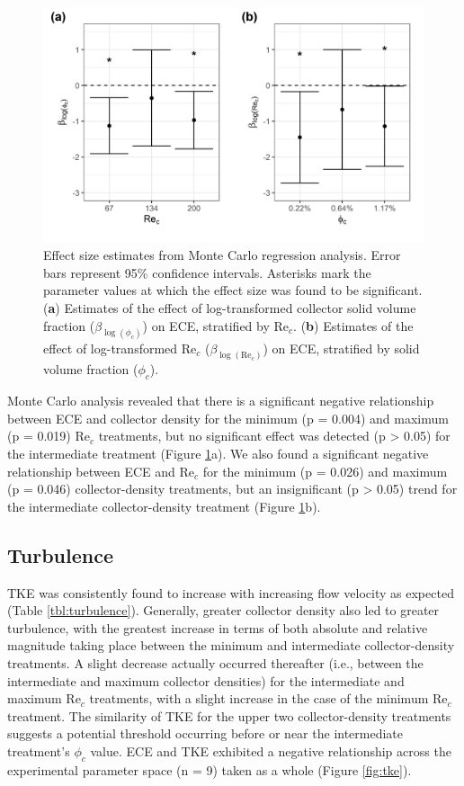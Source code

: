 \documentclass[geosciences,article,submit,moreauthors,pdftex]{Definitions/mdpi}
\newcommand\Rey{\mathrm{Re}}
\begin{document}
\begin{figure}[H]
\centering
\includegraphics[width=5in]{../pics/montecarlo.png}
\caption{Effect size estimates from Monte Carlo regression analysis. Error bars represent 95\% confidence intervals. Asterisks mark the parameter values at which the effect size was found to be significant. (\textbf{a}) Estimates of the effect of log-transformed collector solid volume fraction ($\beta_{\log(\phi_c)}$) on ECE, stratified by $\Rey_c$. (\textbf{b}) Estimates of the effect of log-transformed $\Rey_c$ ($\beta_{\log(\Rey_c)}$) on ECE, stratified by solid volume fraction ($\phi_c$).}
\label{fig:monte}
\end{figure}   

Monte Carlo analysis revealed that there is a significant negative relationship between ECE and collector density for the minimum (p = 0.004) and maximum (p = 0.019) $\Rey_c$ treatments, but no significant effect was detected (p > 0.05) for the intermediate treatment (Figure \ref{fig:monte}a). We also found a significant negative relationship between ECE and $\Rey_c$ for the minimum (p = 0.026) and maximum (p = 0.046) collector-density treatments, but an insignificant (p > 0.05) trend for the intermediate collector-density treatment (Figure \ref{fig:monte}b). 

\subsection{Turbulence}

TKE was consistently found to increase with increasing flow velocity as expected (Table \ref{tbl:turbulence}). Generally, greater collector density also led to greater turbulence, with the greatest increase in terms of both absolute and relative magnitude taking place between the minimum and intermediate collector-density treatments. A slight decrease actually occurred thereafter (i.e., between the intermediate and maximum collector densities) for the intermediate and maximum $\Rey_c$ treatments, with a slight increase in the case of the minimum $\Rey_c$ treatment. The similarity of TKE for the upper two collector-density treatments suggests a potential threshold occurring before or near the intermediate treatment's $\phi_c$ value. ECE and TKE exhibited a negative relationship across the experimental parameter space (n = 9) taken as a whole (Figure \ref{fig:tke}).
\end{document}
